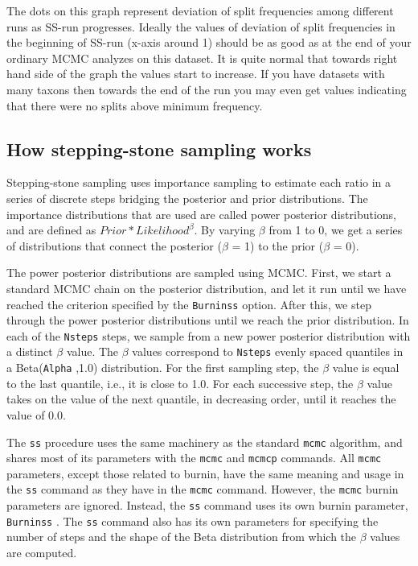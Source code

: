 \documentclass[12pt]{book}
\newcommand{\ttt}[1]{\texttt{#1} }
\begin{document}
The dots on this graph represent deviation of split frequencies among different runs as SS-run
progresses. Ideally the values of deviation of split frequencies in the beginning of SS-run (x-axis
around 1) should be as good as at the end of your ordinary MCMC analyzes on this dataset. It is
quite normal that towards right hand side of the graph the values start to increase. If you have
datasets with many taxons then towards the end of the run you may even get  values indicating that
there were no splits above minimum frequency. 

\subsection{How stepping-stone sampling works}

Stepping-stone sampling uses importance sampling to estimate each ratio in a series of discrete
steps bridging the posterior and prior distributions.  The importance distributions that are used
are called power posterior distributions, and are defined as $Prior*Likelihood^{\beta}$. By varying
$\beta$ from 1 to 0, we get a series of distributions that connect the posterior ($\beta$ = 1) to
the prior ($\beta$ = 0).

The power posterior distributions are sampled using MCMC. First, we start a standard MCMC chain on
the posterior distribution, and let it run until we have reached the criterion specified by the
\ttt{Burninss} option. After this, we step through the power posterior distributions until we reach
the prior distribution.  In each of the \ttt{Nsteps} steps, we sample from a new power posterior
distribution with a distinct $\beta$ value. The $\beta$ values correspond to \ttt{Nsteps} evenly
spaced quantiles in a Beta(\ttt{Alpha},1.0) distribution.  For the first sampling step, the $\beta$
value is equal to the last quantile, i.e., it is close to 1.0. For each successive step, the
$\beta$ value takes on the value of the next quantile, in decreasing order, until it reaches the
value of 0.0.


The \ttt{ss} procedure uses the same machinery as the standard \ttt{mcmc} algorithm, and shares
most of its parameters with the \ttt{mcmc} and \ttt{mcmcp} commands. All \ttt{mcmc} parameters,
except those related to burnin, have the same meaning and usage in the \ttt{ss} command as they
have in the \ttt{mcmc} command. However, the \ttt{mcmc} burnin parameters are ignored. Instead, the
\ttt{ss} command uses its own burnin parameter, \ttt{Burninss}. The \ttt{ss} command also has its
own parameters for specifying the number of steps and the shape of the Beta distribution from which
the $\beta$ values are computed.
\end{document}
